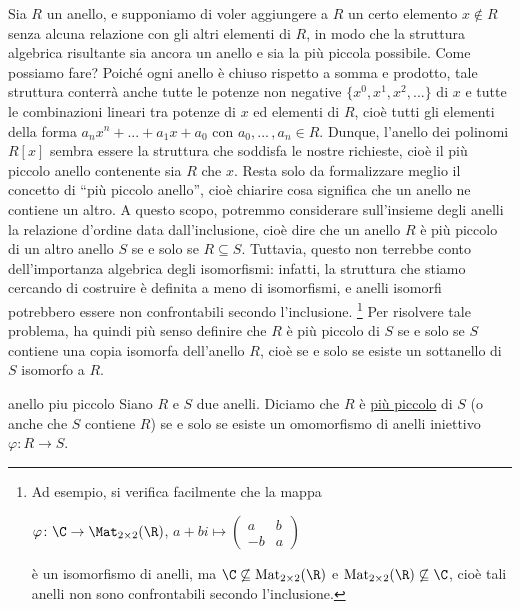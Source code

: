 \noindent Sia $R$ un anello, e supponiamo di voler aggiungere a $R$ un certo elemento $x\notin R$ 
senza alcuna relazione con gli altri elementi di $R$, in modo che la struttura algebrica risultante sia ancora un anello 
e sia la più piccola possibile. Come possiamo fare? 
\vspace{1.5mm}
\noindent Poiché ogni anello è chiuso rispetto a somma e prodotto, tale struttura conterrà anche tutte le potenze non negative 
$\{x^0, x^1, x^2, ...\}$ di $x$ e tutte le combinazioni lineari tra potenze di $x$ ed elementi di $R$, 
cioè tutti gli elementi della forma $a_nx^n + ... + a_1x+a_0$ con $a_0,...\,,a_n\in R$. 
Dunque, l'anello dei polinomi $R[x]$ sembra essere la struttura che soddisfa le nostre richieste, 
cioè il più piccolo anello contenente sia $R$ che $x$. Resta solo da formalizzare meglio il concetto di ``più piccolo anello'', 
cioè chiarire cosa significa che un anello ne contiene un altro.
\vspace{1.5mm}
\noindent A questo scopo, potremmo considerare sull'insieme degli anelli la relazione d'ordine data dall'inclusione, 
cioè dire che un anello $R$ è più piccolo di un altro anello $S$ se e solo se $R\subseteq S$. 
Tuttavia, questo non terrebbe conto dell'importanza algebrica degli isomorfismi: infatti, 
la struttura che stiamo cercando di costruire è definita a meno di isomorfismi, 
e anelli isomorfi potrebbero essere non confrontabili secondo l'inclusione.
\footnote{Ad esempio, si verifica facilmente che la mappa 

$\varphi\colon \C\to \Mat_{2\times 2}(\R)$, $a+bi \mapsto 
\begin{pmatrix} a & b \\ -b & a \end{pmatrix}$ 

è un isomorfismo di anelli, ma 
$\C\not\subseteq \operatorname{Mat}_{2\times 2}(\R)$ e $\operatorname{Mat}_{2\times 2}(\R)\not\subseteq \C$, 
cioè tali anelli non sono confrontabili secondo l'inclusione.} Per risolvere tale problema, 
ha quindi più senso definire che $R$ è più piccolo di $S$ se e solo se $S$ contiene una copia isomorfa dell'anello $R$, 
cioè se e solo se esiste un sottanello di $S$ isomorfo a $R$.

\begin{defn}[]{anello piu piccolo}
Siano $R$ e $S$ due anelli. Diciamo che $R$ è \underline{più piccolo} di $S$ (o anche che $S$ contiene $R$) 
se e solo se esiste un omomorfismo di anelli iniettivo $\varphi \colon R\to S$.
\end{defn} 

